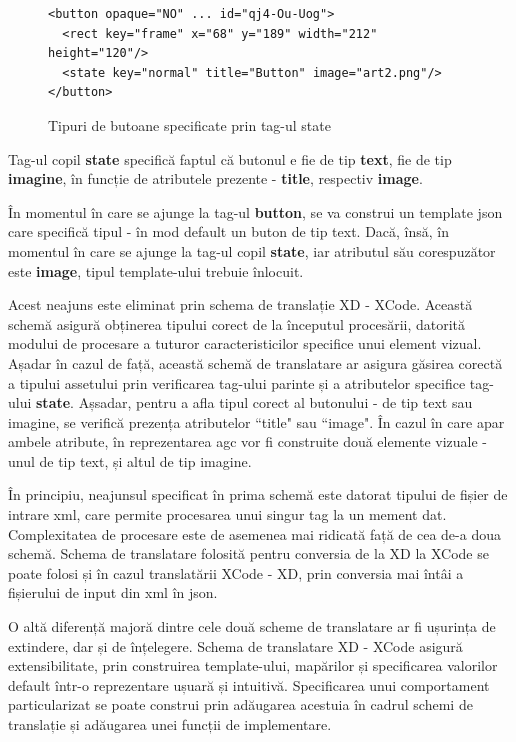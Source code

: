 \begin{figure}[!htbp]
\lstset{language=XML}
\begin{lstlisting}
<button opaque="NO" ... id="qj4-Ou-Uog">
  <rect key="frame" x="68" y="189" width="212" height="120"/>
  <state key="normal" title="Button" image="art2.png"/>
</button>
\end{lstlisting}
\caption{Tipuri de butoane specificate prin tag-ul state} \label{fig:state}
\end{figure}

Tag-ul copil \textbf{state} specifică faptul că butonul e fie de tip \textbf{text}, fie de tip \textbf{imagine}, în funcție de atributele prezente - \textbf{title}, respectiv \textbf{image}.

În momentul în care se ajunge la tag-ul \textbf{button}, se va construi un template json care specifică tipul - în mod default un buton de tip text. Dacă, însă, în momentul în care se ajunge la tag-ul copil \textbf{state}, iar atributul său corespuzător este \textbf{image}, tipul template-ului trebuie înlocuit.

Acest neajuns este eliminat prin schema de translație XD - XCode. Această schemă asigură obținerea tipului corect de la începutul procesării, datorită modului de procesare a tuturor caracteristicilor specifice unui element vizual. 
Așadar în cazul de față, această schemă de translatare ar asigura găsirea corectă a tipului assetului prin verificarea tag-ului parinte și a atributelor specifice tag-ului \textbf{state}. Așsadar, pentru a afla tipul corect al butonului - de tip text sau imagine, se verifică prezența atributelor ``title" sau ``image". În cazul în care apar ambele atribute, în reprezentarea agc vor fi construite două elemente vizuale - unul de tip text, și altul de tip imagine. 

În principiu, neajunsul specificat în prima schemă este datorat tipului de fișier de intrare xml, care permite procesarea unui singur tag la un mement dat. Complexitatea de procesare este de asemenea mai ridicată față de cea de-a doua schemă.
Schema de translatare folosită pentru conversia de la XD la XCode se poate folosi și în cazul translatării XCode - XD, prin conversia mai întâi a fișierului de input din xml în json.

O altă diferență majoră dintre cele două scheme de translatare ar fi ușurința de extindere, dar și de înțelegere. Schema de translatare XD - XCode asigură extensibilitate, prin construirea template-ului, mapărilor și specificarea valorilor default într-o reprezentare ușuară și intuitivă. Specificarea unui comportament particularizat se poate construi prin adăugarea acestuia în cadrul schemi de translație și adăugarea unei funcții de implementare. 


